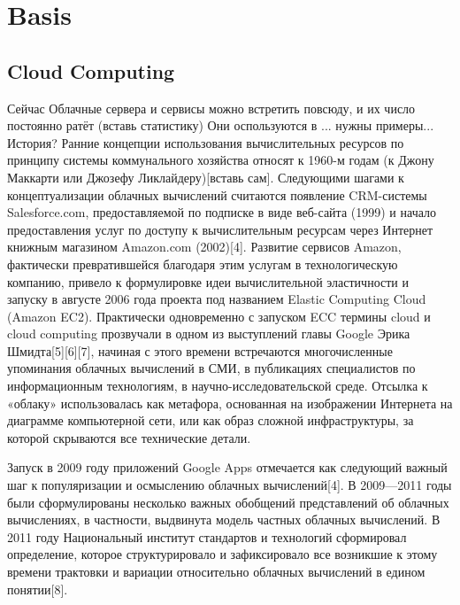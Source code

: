 
\chapter{Basis}
\label{chap:basis}

\section{Cloud Computing}

Сейчас Облачные сервера и сервисы можно встретить повсюду, и их число постоянно ратёт (вставь статистику)
Они оспользуются в ... нужны примеры...
История? 
Ранние концепции использования вычислительных ресурсов по принципу системы коммунального хозяйства относят к 1960-м годам (к Джону Маккарти или Джозефу Ликлайдеру)[вставь сам].
Следующими шагами к концептуализации облачных вычислений считаются появление CRM-системы Salesforce.com, предоставляемой по подписке в виде веб-сайта (1999) и начало предоставления услуг по доступу к вычислительным ресурсам через Интернет книжным магазином Amazon.com (2002)[4]. Развитие сервисов Amazon, фактически превратившейся благодаря этим услугам в технологическую компанию, привело к формулировке идеи вычислительной эластичности и запуску в августе 2006 года проекта под названием Elastic Computing Cloud (Amazon EC2). Практически одновременно с запуском ECC термины cloud и cloud computing прозвучали в одном из выступлений главы Google Эрика Шмидта[5][6][7], начиная с этого времени встречаются многочисленные упоминания облачных вычислений в СМИ, в публикациях специалистов по информационным технологиям, в научно-исследовательской среде. Отсылка к «облаку» использовалась как метафора, основанная на изображении Интернета на диаграмме компьютерной сети, или как образ сложной инфраструктуры, за которой скрываются все технические детали.

Запуск в 2009 году приложений Google Apps отмечается как следующий важный шаг к популяризации и осмыслению облачных вычислений[4]. В 2009—2011 годы были сформулированы несколько важных обобщений представлений об облачных вычислениях, в частности, выдвинута модель частных облачных вычислений. В 2011 году Национальный институт стандартов и технологий сформировал определение, которое структурировало и зафиксировало все возникшие к этому времени трактовки и вариации относительно облачных вычислений в едином понятии[8].

